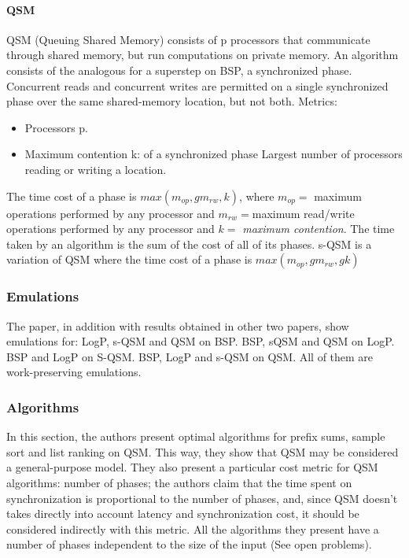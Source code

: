 \documentclass[12pt,a4paper]{article}
\begin{document}
\paragraph{QSM}
QSM (Queuing Shared Memory) consists of p processors that communicate through shared memory, but run computations on private memory. An algorithm consists 
of the analogous for a superstep on BSP, a synchronized phase. Concurrent reads and concurrent writes are permitted on a single synchronized phase 
over the same shared-memory location, but not both.
Metrics:
\begin{itemize}
	\item Processors p.
	\item Maximum contention k: of a synchronized phase Largest number of processors reading or writing a location.
\end{itemize}
The time cost of a phase is $max(m_{op}, gm_{rw}, k)$, where $m_{op}= $ maximum operations performed by any processor and $m_{rw}=$maximum read/write 
operations performed by any processor and $k=$ \textit{maximum contention}. The time taken by an algorithm is the sum of the cost of all of its phases.
s-QSM is a variation of QSM where the time cost of a phase is $max(m_{op}, gm_{rw}, gk)$

\subsubsection{Emulations}
The paper, in addition with results obtained in other two papers, show emulations for: LogP, s-QSM and QSM on BSP. BSP, sQSM and QSM on LogP. BSP 
and LogP on S-QSM. BSP, LogP and s-QSM on QSM. All of them are work-preserving emulations.

\subsubsection{Algorithms}
In this section, the authors present optimal algorithms for prefix sums, sample sort and list ranking on QSM. This way, they show that QSM may be 
considered a general-purpose model. They also present a particular cost metric for QSM algorithms: number of phases; the authors claim that the time 
spent on synchronization is proportional to the number of phases, and, since QSM doesn't takes directly into account latency and synchronization cost,
it should be considered indirectly with this metric. All the algorithms they present have a number of phases independent to the size of the 
input (See open problems).
\end{document}
